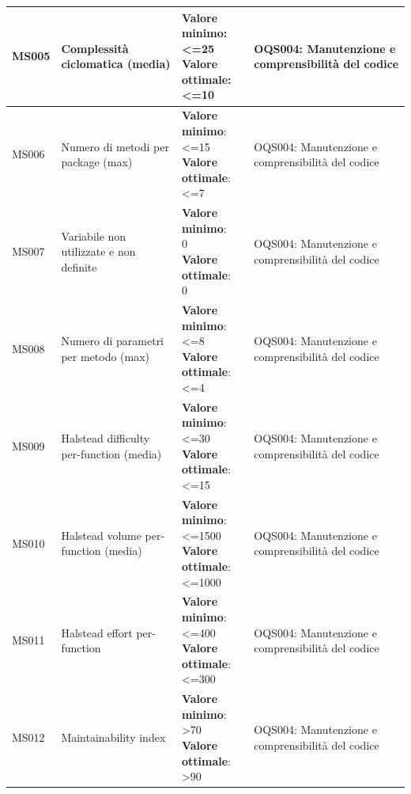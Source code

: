{\begin{center}
\begin{longtable}{|
			*{1}{>{\centering\arraybackslash}p{1.7 cm}|}
			*{1}{>{\centering\arraybackslash}p{2.3 cm}|}
			*{1}{>{\centering\arraybackslash}p{4.0 cm}|}
			*{1}{>{\centering\arraybackslash}p{2.4 cm}|}}
		\hline MS005 & Complessità ciclomatica (media) & \makecell{\textbf{Valore minimo}: \\ <=25  \\ \textbf{Valore ottimale}: \\ <=10} &  OQS004: Manutenzione e comprensibilità del codice \\
		\hline MS006 & Numero di metodi per package (max) & \makecell{\textbf{Valore minimo}: \\ <=15  \\ \textbf{Valore ottimale}: \\  <=7} &  OQS004: Manutenzione e comprensibilità del codice \\
		\hline MS007 & Variabile non utilizzate e non definite & \makecell{\textbf{Valore minimo}: \\ 0  \\ \textbf{Valore ottimale}: \\ 0} &  OQS004: Manutenzione e comprensibilità del codice \\
		\hline MS008 & Numero di parametri per metodo (max) & \makecell{\textbf{Valore minimo}: \\ <=8  \\ \textbf{Valore ottimale}: \\ <=4} &  OQS004: Manutenzione e comprensibilità del codice \\
		\hline MS009 & Halstead difficulty per-function (media) & \makecell{\textbf{Valore minimo}: \\ <=30 \\ \textbf{Valore ottimale}: \\ <=15} &  OQS004: Manutenzione e comprensibilità del codice \\
		\hline MS010 & Halstead volume per-function (media) & \makecell{\textbf{Valore minimo}: \\ <=1500 \\ \textbf{Valore ottimale}: \\ <=1000} &  OQS004: Manutenzione e comprensibilità del codice \\
		\hline MS011 & Halstead effort per-function & \makecell{\textbf{Valore minimo}: \\ <=400 \\ \textbf{Valore ottimale}: \\ <=300} &  OQS004: Manutenzione e comprensibilità del codice \\
		\hline MS012 & Maintainability index & \makecell{\textbf{Valore minimo}: \\ >70 \\ \textbf{Valore ottimale}:\\ >90} &  OQS004: Manutenzione e comprensibilità del codice \\
		\hline
		

\end{longtable}
\end{center}}
